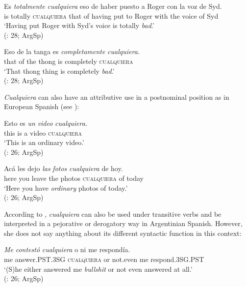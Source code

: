 \ea \label{ex:key:67} %
  \gll Es \textit{totalmente} \textit{cualquiera} eso de haber puesto a Roger con la voz de Syd.\\
  is totally \textsc{cualquiera} that of having put to Roger with the voice of Syd\\
  \glt ‘Having put Roger with Syd’s voice is totally \textit{bad}.’\\
  (\citealt{Rizzosalierno2013}: 28; ArgSp)
\z 

\ea \label{ex:key:68} %
  \gll Eso de la tanga es \textit{completamente} \textit{cualquiera.}\\
  that of the thong is completely \textsc{cualquiera}\\
  \glt ‘That thong thing is completely \textit{bad}.’\\
  (\citealt{Rizzosalierno2013}: 28; ArgSp)
\z

\textit{Cualquiera} can also have an attributive use in a postnominal position as in European Spanish (see ):

\ea \label{ex:key:69} %
  \gll Esto es \textit{un} \textit{video} \textit{cualquiera.}\\
  this is a video \textsc{cualquiera}\\
  \glt ‘This is an ordinary video.’\\
  (\citealt{Rizzosalierno2013}: 26; ArgSp)
\z 

\ea \label{ex:key:70} %
  \gll Acá les dejo \textit{las} \textit{fotos} \textit{cualquiera} de hoy.\\
  here you leave the photos \textsc{cualquiera} of today\\
  \glt ‘Here you have \textit{ordinary} photos of today.’\\
  (\citealt{Rizzosalierno2013}: 26; ArgSp)
\z

According to \citet{Rizzosalierno2013}, \textit{cualquiera} can also be used under transitive verbs and be interpreted in a pejorative or derogatory way in Argentinian Spanish. However, she does not say anything about its different syntactic function in this context:

\ea \label{ex:key:71} %
  \gll \textit{Me} \textit{contestó} \textit{cualquiera} o ni me respondía.\\
  me answer.PST.3SG \textsc{cualquiera} or not.even me respond.3SG.PST\\
  \glt ‘(S)he either answered me \textit{bullshit} or not even answered at all.’\\
  (\citealt{Rizzosalierno2013}: 26; ArgSp)
\z 


